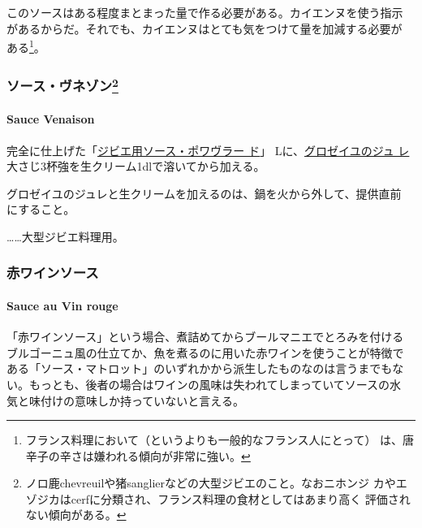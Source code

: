 \begin{recette}
このソースはある程度まとまった量で作る必要がある。カイエンヌを使う指示
があるからだ。それでも、カイエンヌはとても気をつけて量を加減する必要が
ある\footnote{フランス料理において（というよりも一般的なフランス人にとって）
  は、唐辛子の辛さは嫌われる傾向が非常に強い。}。

\maeaki

\hypertarget{ux30bdux30fcux30b9ux30f4ux30cdux30beux30f395}{%
\subsubsection[ソース・ヴネゾン]{\texorpdfstring{ソース・ヴネゾン\footnote{ノロ鹿chevreuilや猪sanglierなどの大型ジビエのこと。なおニホンジ
  カやエゾジカはcerfに分類され、フランス料理の食材としてはあまり高く
  評価されない傾向がある。}}{ソース・ヴネゾン}}\label{ux30bdux30fcux30b9ux30f4ux30cdux30beux30f395}}

\hypertarget{sauce-venaison}{%
\paragraph{Sauce Venaison}\label{sauce-venaison}}

完全に仕上げた「\protect\hyperlink{sauce-poivrade-pour-gibier}{ジビエ用ソース・ポワヴラー
ド}」\troisquarts{} Lに、\href{}{グロゼイユのジュ
レ}大さじ3杯強を生クリーム1dlで溶いてから加える。

グロゼイユのジュレと生クリームを加えるのは、鍋を火から外して、提供直前
にすること。

\ldots{}\ldots{}大型ジビエ料理用。

\maeaki

\hypertarget{ux8d64ux30efux30a4ux30f3ux30bdux30fcux30b9}{%
\subsubsection{赤ワインソース}\label{ux8d64ux30efux30a4ux30f3ux30bdux30fcux30b9}}

\hypertarget{sauce-au-vin-rouge}{%
\paragraph{Sauce au Vin rouge}\label{sauce-au-vin-rouge}}

  

「赤ワインソース」という場合、煮詰めてからブールマニエでとろみを付ける
ブルゴーニュ風の仕立てか、魚を煮るのに用いた赤ワインを使うことが特徴で
ある「ソース・マトロット」のいずれかから派生したものなのは言うまでもな
い。もっとも、後者の場合はワインの風味は失われてしまっていてソースの水
気と味付けの意味しか持っていないと言える。


\end{recette}
